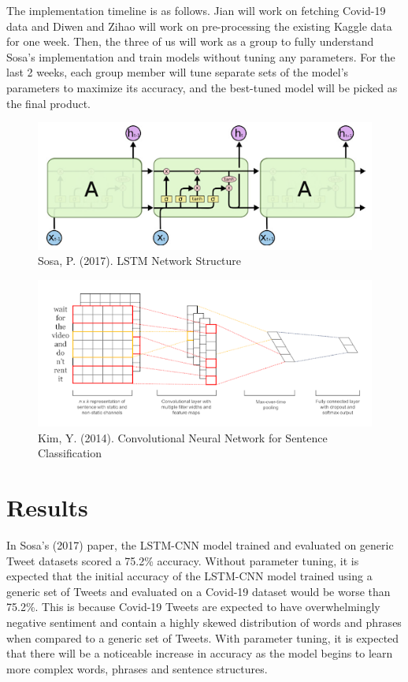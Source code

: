 \documentclass[letterpaper]{article} %
\begin{document}
The implementation timeline is as follows. Jian will work on fetching Covid-19 data and Diwen and Zihao will work on pre-processing the existing Kaggle data for one week. Then, the three of us will work as a group to fully understand Sosa's implementation and train models without tuning any parameters. For the last 2 weeks, each group member will tune separate sets of the model's parameters to maximize its accuracy, and the best-tuned model will be picked as the final product.

\begin{figure}
  \includegraphics[width=\linewidth]{figure2.png}
  \caption{Sosa, P. (2017). LSTM Network Structure}
  \label{fig:fig2}
\end{figure}


\begin{figure}
  \includegraphics[width=\linewidth]{figure3.png}
  \caption{Kim, Y. (2014). Convolutional Neural Network for Sentence Classification}
  \label{fig:fig3}
\end{figure}



\section{Results}

In Sosa's (2017) paper, the LSTM-CNN model trained and evaluated on generic Tweet datasets scored a 75.2\% accuracy. Without parameter tuning, it is expected that the initial accuracy of the LSTM-CNN model trained using a generic set of Tweets and evaluated on a Covid-19 dataset would be worse than 75.2\%. This is because Covid-19 Tweets are expected to have overwhelmingly negative sentiment and contain a highly skewed distribution of words and phrases when compared to a generic set of Tweets. With parameter tuning, it is expected that there will be a noticeable increase in accuracy as the model begins to learn more complex words, phrases and sentence structures.

\newpage
\nocite{*}


\end{document}
